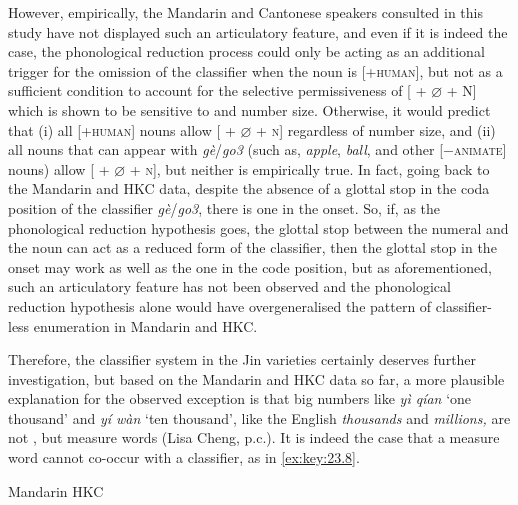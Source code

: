 \documentclass[output=paper]{langsci/langscibook}
\begin{document}
However, empirically, the Mandarin and Cantonese
speakers consulted in this study have not displayed such an articulatory
feature, and even if it is indeed the case, the phonological reduction process
could only be acting as an additional trigger for the omission of the
classifier when the noun is [+\textsc{human}], but not as a sufficient
condition to account for the selective permissiveness of [\Num{} +
$\varnothing$ + N] which is shown to be sensitive to  and number
size. Otherwise, it would predict that (i) all [+\textsc{human}] nouns allow
[\Num{} + $\varnothing$ + \textsc{n}] regardless of number size, and (ii) all
nouns that can appear with \emph{gè}/\emph{go3} (such as, \emph{apple},
\emph{ball}, and other [$-$\textsc{animate}] nouns) allow [\Num{} +
$\varnothing$ + \textsc{n}], but neither is empirically true. In fact,
going back to the Mandarin and \gls{HKC} data, despite the absence of a glottal
stop in the coda position of the classifier \emph{gè}/\emph{go3}, there is one
in the onset. So, if, as the phonological reduction hypothesis goes, the
glottal stop between the numeral and the noun can act as a reduced form of the
classifier, then the glottal stop in the onset may work as well as the one in
the code position, but as aforementioned, such an articulatory feature has not
been observed and the phonological reduction hypothesis alone would have
overgeneralised the pattern of classifier-less enumeration in Mandarin and
\gls{HKC}.

Therefore, the classifier system in the Jin varieties certainly deserves
further investigation, but based on the Mandarin and \gls{HKC} data so far, a
more plausible explanation for the observed exception is that big numbers like
\emph{yì qían} ‘one thousand’ and \emph{yí wàn} ‘ten thousand’, like the
English \emph{thousands} and \emph{millions,} are not , but
measure words (Lisa Cheng, p.c.). It is indeed the case that a measure word
cannot co-occur with a classifier, as in \eqref{ex:key:23.8}.

\ea\label{ex:key:23.8} %
	\ea Mandarin
    \ex \gls{HKC}
	\z
\z
\end{document}
